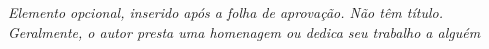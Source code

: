 \begin{dedicatoria}
   \vspace*{\fill}
   \centering
   \noindent
   \textit{ Elemento opcional, inserido após a folha de aprovação. Não têm título. Geralmente, o autor presta uma homenagem ou dedica seu trabalho a alguém} 
\end{dedicatoria}